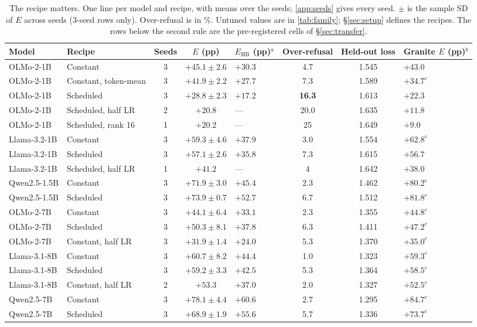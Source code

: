 \documentclass[11pt]{article}
\newcommand{\Ehb}{E_{\mathrm{HB}}}
\begin{document}
\begin{table}[t]
  \caption{The recipe matters. One line per model and recipe, with means over
    the seeds; \cref{app:seeds} gives every seed. $\pm$ is the sample SD of $E$
    across seeds (3-seed rows only). Over-refusal is in \%. Untuned values are
    in \cref{tab:family}; \S\ref{sec:setup} defines the recipes. The rows below
    the second rule are the pre-registered cells of \S\ref{sec:transfer}.}
  \label{tab:recipe}
  \centering
  \footnotesize
  \setlength{\tabcolsep}{3.5pt}
  \begin{tabular}{@{}l l c c C{1.8cm} c c C{1.9cm}@{}}
    \toprule
    Model & Recipe & Seeds & $E$ (pp) & $\Ehb$ (pp)$^{a}$ & Over-refusal & Held-out loss & Granite $E$ (pp)$^{b}$ \\
    \midrule
    OLMo-2-1B & Constant & 3 & $+45.1 \pm 2.6$ & $+30.3$ & 4.7 & 1.545 & $+43.0$ \\
    OLMo-2-1B & Constant, token-mean & 3 & $+41.9 \pm 2.2$ & $+27.7$ & 7.3 & 1.589 & $+34.7^{c}$ \\
    OLMo-2-1B & Scheduled & 3 & $\mathbf{+28.8} \pm 2.3$ & $+17.2$ & \textbf{16.3} & 1.613 & $+22.3$ \\
    OLMo-2-1B & Scheduled, half LR & 2 & $+20.8$ & --- & 20.0 & 1.635 & $+11.8$ \\
    OLMo-2-1B & Scheduled, rank 16 & 1 & $+20.2$ & --- & 25 & 1.649 & $+9.0$ \\
    Llama-3.2-1B & Constant & 3 & $+59.3 \pm 4.6$ & $+37.9$ & 3.0 & 1.554 & $+62.8^{c}$ \\
    Llama-3.2-1B & Scheduled & 3 & $+57.1 \pm 2.6$ & $+35.8$ & 7.3 & 1.615 & $+56.7$ \\
    Llama-3.2-1B & Scheduled, half LR & 1 & $+41.2$ & --- & 4 & 1.642 & $+38.0$ \\
    \midrule
    Qwen2.5-1.5B & Constant & 3 & $+71.9 \pm 3.0$ & $+45.4$ & 2.3 & 1.462 & $+80.2^{c}$ \\
    Qwen2.5-1.5B & Scheduled & 3 & $+73.9 \pm 0.7$ & $+52.7$ & 6.7 & 1.512 & $+81.8^{c}$ \\
    OLMo-2-7B & Constant & 3 & $+44.1 \pm 6.4$ & $+33.1$ & 2.3 & 1.355 & $+44.8^{c}$ \\
    OLMo-2-7B & Scheduled & 3 & $+50.3 \pm 8.1$ & $+37.8$ & 6.3 & 1.411 & $+47.2^{c}$ \\
    OLMo-2-7B & Constant, half LR & 3 & $\mathbf{+31.9} \pm 1.4$ & $+24.0$ & 5.3 & 1.370 & $+35.0^{c}$ \\
    Llama-3.1-8B & Constant & 3 & $+60.7 \pm 8.2$ & $+44.4$ & 1.0 & 1.323 & $+59.3^{c}$ \\
    Llama-3.1-8B & Scheduled & 3 & $+59.2 \pm 3.3$ & $+42.5$ & 5.3 & 1.364 & $+58.5^{c}$ \\
    Llama-3.1-8B & Constant, half LR & 2 & $+53.3$ & $+37.0$ & 2.0 & 1.327 & $+52.5^{c}$ \\
    Qwen2.5-7B & Constant & 3 & $+78.1 \pm 4.4$ & $+60.6$ & 2.7 & 1.295 & $+84.7^{c}$ \\
    Qwen2.5-7B & Scheduled & 3 & $\mathbf{+68.9} \pm 1.9$ & $+55.6$ & 5.7 & 1.336 & $+73.7^{c}$ \\
    \bottomrule
  \end{tabular}


\end{table}
\end{document}
